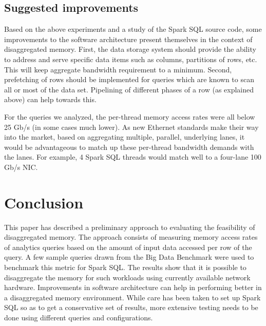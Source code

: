 \documentclass[9pt]{sig-alternate-05-2015}
\begin{document}
\subsection{Suggested improvements}

Based on the above experiments and a study of the Spark SQL source code, some
improvements to the software architecture present themselves in the context of
disaggregated memory.  First, the data storage system should provide the
ability to address and serve specific data items such as columns, partitions of
rows, etc.  This will keep aggregate bandwidth requirement to a minimum.
Second, prefetching of rows should be implemented for queries which are known
to scan all or most of the data set. Pipelining of different phases of a row
(as explained above) can help towards this.

For the queries we analyzed, the per-thread memory access rates were all below
25 Gb/s (in some cases much lower).  As new Ethernet standards make their way
into the market, based on aggregating multiple, parallel, underlying lanes, it
would be advantageous to match up these per-thread bandwidth demands with the
lanes.  For example, 4 Spark SQL threads would match well to a four-lane 100
Gb/s NIC.

\section{Conclusion}

This paper has described a preliminary approach to evaluating the feasibility
of disaggregated memory. The approach consists of measuring memory access rates
of analytics queries based on the amount of input data accessed per row of the
query. A few sample queries drawn from the Big Data Benchmark
\cite{bigDataBenchmark} were used to benchmark this metric for Spark SQL.  The
results show that it is possible to disaggregate the memory for such workloads
using currently available network hardware.  Improvements in software
architecture can help in performing better in a disaggregated memory
environment. While care has been taken to set up Spark SQL so as to get a
conservative set of results, more extensive testing needs to be done using
different queries and configurations.

 

\label{last-page}
\end{document}
